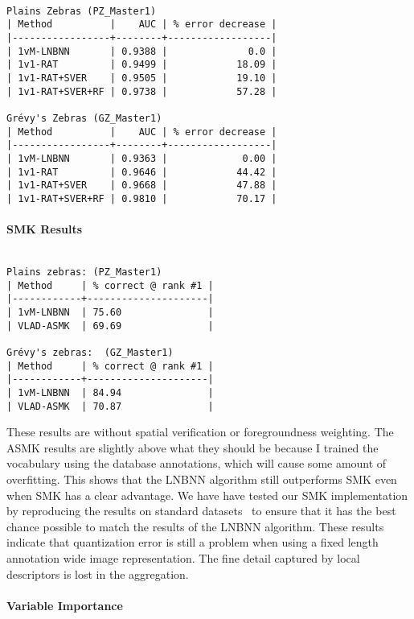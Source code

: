\begin{verbatim}

Plains Zebras (PZ_Master1)
| Method          |    AUC | % error decrease |
|-----------------+--------+------------------|
| 1vM-LNBNN       | 0.9388 |              0.0 |
| 1v1-RAT         | 0.9499 |            18.09 |
| 1v1-RAT+SVER    | 0.9505 |            19.10 |
| 1v1-RAT+SVER+RF | 0.9738 |            57.28 |

Grévy's Zebras (GZ_Master1)
| Method          |    AUC | % error decrease |
|-----------------+--------+------------------|
| 1vM-LNBNN       | 0.9363 |             0.00 |
| 1v1-RAT         | 0.9646 |            44.42 |
| 1v1-RAT+SVER    | 0.9668 |            47.88 |
| 1v1-RAT+SVER+RF | 0.9810 |            70.17 |

\end{verbatim}


\paragraph{SMK Results}

\begin{verbatim}

Plains zebras: (PZ_Master1)
| Method     | % correct @ rank #1 |
|------------+---------------------|
| 1vM-LNBNN  | 75.60               |
| VLAD-ASMK  | 69.69               |

Grévy's zebras:  (GZ_Master1)
| Method     | % correct @ rank #1 |
|------------+---------------------|
| 1vM-LNBNN  | 84.94               |
| VLAD-ASMK  | 70.87               |

\end{verbatim}

These results are without spatial verification or foregroundness weighting.
The ASMK results are slightly above what they should be because I trained the
  vocabulary using the database annotations, which will cause some amount of
  overfitting.
This shows that the LNBNN algorithm still outperforms SMK even when SMK has a
  clear advantage.
We have have tested our SMK implementation by reproducing the results on
  standard datasets~\cite{tolias_2012} to ensure that it has the best chance
  possible to match the results of the LNBNN algorithm.
These results indicate that quantization error is still a problem when using 
a fixed length annotation wide image representation.
The fine detail captured by local descriptors is lost in the aggregation.


\paragraph{Variable Importance}

